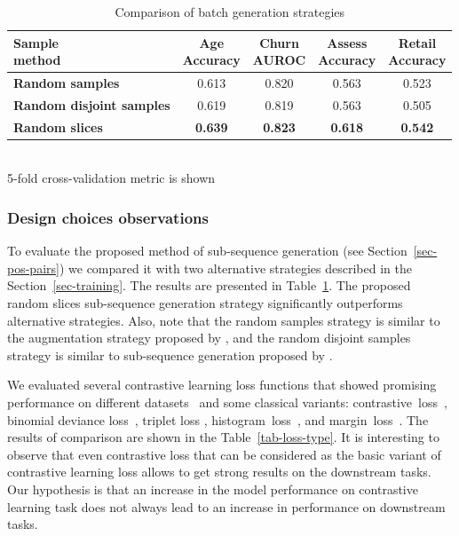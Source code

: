 \documentclass[sigconf, anonymous]{acmart}
\begin{document}
\begin{table}
\centering
\caption{Comparison of batch generation strategies}
\begin{tabularx}{\linewidth}{Xcccc}
\toprule
\makecell{\textbf{Sample} \\ \textbf{method}} &
\makecell{\textbf{Age} \\ \small{Accuracy}} &
\makecell{\textbf{Churn} \\ \small{AUROC}} &
\makecell{\textbf{Assess} \\ \small{Accuracy}} &
\makecell{\textbf{Retail} \\ \small{Accuracy}} \\
\midrule
\textbf{Random samples} & 0.613 & 0.820 & 0.563 & 0.523 \\
\textbf{Random disjoint samples} & 0.619 & 0.819 & 0.563 & 0.505 \\
\textbf{Random slices} & \textbf{0.639} & \textbf{0.823} & \textbf{0.618} & \textbf{0.542} \\
\bottomrule
\end{tabularx} \\
\small{5-fold cross-validation metric is shown}
\label{tab-pair-gen}
\end{table}

\subsubsection{Design choices observations}

To evaluate the proposed method of sub-sequence generation (see Section~\ref{sec-pos-pairs}) we compared it with two alternative strategies described in the Section~\ref{sec-training}. The results are presented in Table~\ref{tab-pair-gen}. The proposed random slices sub-sequence generation strategy significantly outperforms alternative strategies.
Also, note that the random samples strategy is similar to the augmentation strategy proposed by \cite{Yao2020SelfsupervisedLF}, and the random disjoint samples strategy is similar to sub-sequence generation proposed by \cite{Ma2020DisentangledSI}.

We evaluated several contrastive learning loss functions that showed promising performance on different datasets~\citep{Kaya2019DeepML} and some classical variants: contrastive~loss~\citep{Hadsell2006DimensionalityRB}, binomial deviance loss~\citep{Yi2014DeepML}, triplet loss \citep{Hoffer2015DeepML}, histogram~loss~\citep{Ustinova2016LearningDE}, and margin~loss~\citep{Manmatha2017SamplingMI}. The results of comparison are shown in the Table~\ref{tab-loss-type}. 
It is interesting to observe that even contrastive loss that can be considered as the basic variant of contrastive learning loss allows to get strong results on the downstream tasks. Our hypothesis is that an increase in the model performance on contrastive learning task does not always lead to an increase in performance on downstream tasks.
\end{document}
